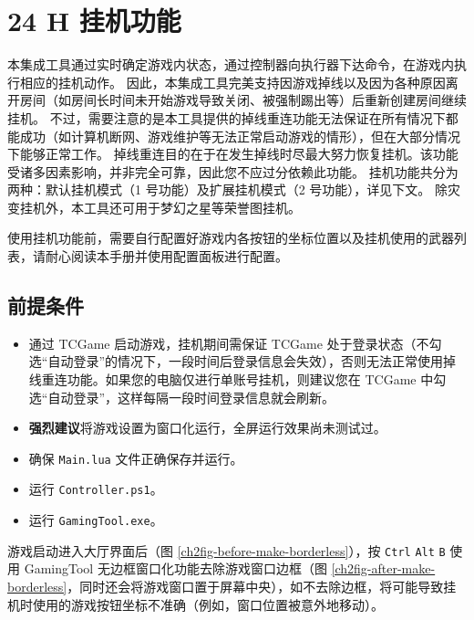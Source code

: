 \section{24 H 挂机功能}

本集成工具通过实时确定游戏内状态，通过控制器向执行器下达命令，在游戏内执行相应的挂机动作。
因此，本集成工具完美支持因游戏掉线以及因为各种原因离开房间（如房间长时间未开始游戏导致关闭、被强制踢出等）后重新创建房间继续挂机。
不过，需要注意的是本工具提供的掉线重连功能无法保证在所有情况下都能成功（如计算机断网、游戏维护等无法正常启动游戏的情形），但在大部分情况下能够正常工作。
掉线重连目的在于在发生掉线时尽最大努力恢复挂机。该功能受诸多因素影响，并非完全可靠，因此您不应过分依赖此功能。
挂机功能共分为两种：默认挂机模式（1 号功能）及扩展挂机模式（2 号功能），详见下文。
除灾变挂机外，本工具还可用于梦幻之星等荣誉图挂机。

使用挂机功能前，需要自行配置好游戏内各按钮的坐标位置以及挂机使用的武器列表，请耐心阅读本手册并使用配置面板进行配置。

\subsection{前提条件}

\begin{itemize}

\item 通过 TCGame 启动游戏，挂机期间需保证 TCGame 处于登录状态（不勾选“自动登录”的情况下，一段时间后登录信息会失效），否则无法正常使用掉线重连功能。如果您的电脑仅进行单账号挂机，则建议您在 TCGame 中勾选“自动登录”，这样每隔一段时间登录信息就会刷新。

\item \textbf{\color{red}强烈建议}将游戏设置为窗口化运行，全屏运行效果尚未测试过。

\item 确保 \lstinline{Main.lua} 文件正确保存并运行。

\item 运行 \lstinline{Controller.ps1}。

\item 运行 \lstinline{GamingTool.exe}。

\end{itemize}

游戏启动进入大厅界面后（图 \ref{ch2fig-before-make-borderless}），按 \lstinline{Ctrl} \lstinline{Alt} \lstinline{B} 使用 GamingTool 无边框窗口化功能去除游戏窗口边框（图 \ref{ch2fig-after-make-borderless}，同时还会将游戏窗口置于屏幕中央），如不去除边框，将可能导致挂机时使用的游戏按钮坐标不准确（例如，窗口位置被意外地移动）。

